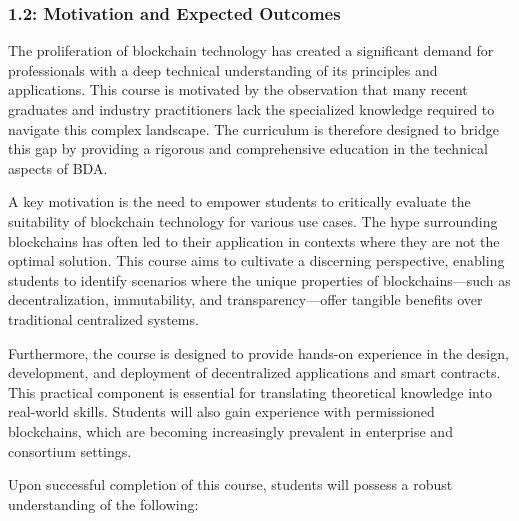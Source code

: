 \subsubsection{1.2: Motivation and Expected
	Outcomes}\label{motivation-and-expected-outcomes}

The proliferation of blockchain technology has created a significant
demand for professionals with a deep technical understanding of its
principles and applications. This course is motivated by the observation
that many recent graduates and industry practitioners lack the
specialized knowledge required to navigate this complex landscape. The
curriculum is therefore designed to bridge this gap by providing a
rigorous and comprehensive education in the technical aspects of BDA.

A key motivation is the need to empower students to critically evaluate
the suitability of blockchain technology for various use cases. The hype
surrounding blockchains has often led to their application in contexts
where they are not the optimal solution. This course aims to cultivate a
discerning perspective, enabling students to identify scenarios where
the unique properties of blockchains---such as decentralization,
immutability, and transparency---offer tangible benefits over
traditional centralized systems.

Furthermore, the course is designed to provide hands-on experience in
the design, development, and deployment of decentralized applications
and smart contracts. This practical component is essential for
translating theoretical knowledge into real-world skills. Students will
also gain experience with permissioned blockchains, which are becoming
increasingly prevalent in enterprise and consortium settings.

Upon successful completion of this course, students will possess a
robust understanding of the following:

